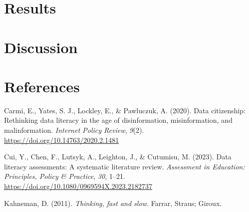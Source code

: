 \documentclass[
  12pt,
  a4paper,
  twoside]{article}
\newlength{\cslhangindent}
\newlength{\cslentryspacingunit} %
\newenvironment{CSLReferences}[2] %
 {%
  \setlength{\parindent}{0pt}
  \ifodd #1
  \let\oldpar\par
  \def\par{\hangindent=\cslhangindent\oldpar}
  \fi
  \setlength{\parskip}{#2\cslentryspacingunit}
 }%
 {}
\begin{document}
\hypertarget{results}{%
\section{Results}\label{results}}

\hypertarget{discussion}{%
\section{Discussion}\label{discussion}}

\hypertarget{references}{%
\section*{References}\label{references}}

\hypertarget{refs}{}
\begin{CSLReferences}{1}{0}
\leavevmode{}%
Carmi, E., Yates, S. J., Lockley, E., \& Pawluczuk, A. (2020). Data citizenship: Rethinking data literacy in the age of disinformation, misinformation, and malinformation. \emph{Internet Policy Review}, \emph{9}(2). \url{https://doi.org/10.14763/2020.2.1481}

\leavevmode{}%
Cui, Y., Chen, F., Lutsyk, A., Leighton, J., \& Cutumisu, M. (2023). Data literacy assessments: A systematic literature review. \emph{Assessment in Education: Principles, Policy \& Practice}, \emph{30}, 1--21. \url{https://doi.org/10.1080/0969594X.2023.2182737}

\leavevmode{}%
Kahneman, D. (2011). \emph{Thinking, fast and slow}. Farrar, Straus; Giroux.

\end{CSLReferences}
\end{document}
